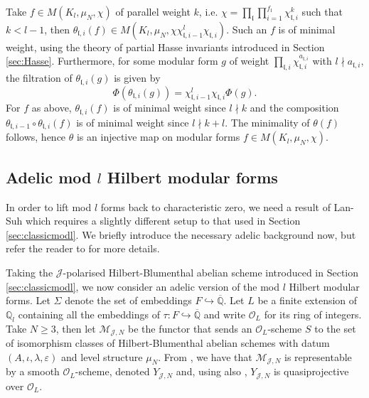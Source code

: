 \documentclass[a4paper,oneside]{amsart}
\theoremstyle{plain}
\theoremstyle{definition}
\begin{document}
Take $f \in M(K_l, \mu_N, \chi)$ of parallel weight $k$, i.e. $\chi = \prod_{\mathfrak{l}} \prod_{i=1}^{f_\mathfrak{l}} \chi_{\mathfrak{l},i}^k$ such that $k < l - 1$, then $\theta_{\mathfrak{l},i}(f) \in M(K_l, \mu_N, \chi\chi_{\mathfrak{l},{i-1}}^l\chi_{\mathfrak{l}, i})$. Such an $f$ is of minimal weight, using the theory of partial Hasse invariants introduced in Section \ref{sec:Hasse}. Furthermore, for some modular form $g$ of weight $\prod_{\mathfrak{l},i} \chi_{\mathfrak{l},i}^{a_{\mathfrak{l},i}}$ with $l \nmid a_{\mathfrak{l},i}$,  the filtration of $\theta_{\mathfrak{l},i}(g)$ is given by
\begin{equation*}
    \Phi(\theta_{\mathfrak{l},i}(g))=\chi_{\mathfrak{l},i-1}^l\chi_{\mathfrak{l},i} \Phi(g).
\end{equation*}
For $f$ as above, $\theta_{\mathfrak{l},i}(f)$ is of minimal weight since $l \nmid k$ and the composition $\theta_{\mathfrak{l},i-1}\circ\theta_{\mathfrak{l},i}(f)$ is of minimal weight since $l \nmid k+l$. The minimality of $\theta(f)$ follows, hence $\theta$ is an injective map on modular forms $f \in M(K_l, \mu_N, \chi)$.


\subsection{Adelic mod $l$ Hilbert modular forms}
\label{sec:adelicmodl}
In order to lift mod $l$ forms back to characteristic zero, we need a result of Lan-Suh \cite{lansuh} which requires a slightly different setup to that used in Section \ref{sec:classicmodl}. We briefly introduce the necessary adelic background now, but refer the reader to \cite{diamondsasaki} for more details. 

Taking the $\mathcal{J}$-polarised Hilbert-Blumenthal abelian scheme introduced in Section \ref{sec:classicmodl}, we now consider an adelic version of the mod $l$ Hilbert modular forms. Let $\Sigma$ denote the set of embeddings $F \hookrightarrow \overline{\mathbb{Q}}$. Let $L$ be a finite extension of $\mathbb{Q}_l$ containing all the embeddings of $\tau: F \hookrightarrow \overline{\mathbb{Q}}$ and write $\mathcal{O}_L$ for its ring of integers. Take $N \geq 3$, then let $\mathcal{M}_{\mathcal{J},N}$ be the functor that sends an $\mathcal{O}_L$-scheme $S$ to the set of isomorphism classes of Hilbert-Blumenthal abelian schemes with datum $(A, \iota, \lambda, \varepsilon)$ and level structure $\mu_N$. From \cite[Thm. 2.2]{delignepappas}, we have that $\mathcal{M}_{\mathcal{J},N}$ is representable by a smooth $\mathcal{O}_L$-scheme, denoted $Y_{\mathcal{J},N}$ and, using also \cite[Thm. 1.4]{chai}, $Y_{\mathcal{J},N}$ is quasiprojective over $\mathcal{O}_L$.
\end{document}
